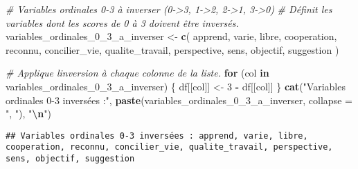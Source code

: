 \documentclass[
]{article}
\newenvironment{Shaded}{\begin{snugshade}}{\end{snugshade}}
\newcommand{\AttributeTok}[1]{\textcolor[rgb]{0.13,0.29,0.53}{#1}}
\newcommand{\CommentTok}[1]{\textcolor[rgb]{0.56,0.35,0.01}{\textit{#1}}}
\newcommand{\ControlFlowTok}[1]{\textcolor[rgb]{0.13,0.29,0.53}{\textbf{#1}}}
\newcommand{\DecValTok}[1]{\textcolor[rgb]{0.00,0.00,0.81}{#1}}
\newcommand{\FunctionTok}[1]{\textcolor[rgb]{0.13,0.29,0.53}{\textbf{#1}}}
\newcommand{\NormalTok}[1]{#1}
\newcommand{\OtherTok}[1]{\textcolor[rgb]{0.56,0.35,0.01}{#1}}
\newcommand{\SpecialCharTok}[1]{\textcolor[rgb]{0.81,0.36,0.00}{\textbf{#1}}}
\newcommand{\StringTok}[1]{\textcolor[rgb]{0.31,0.60,0.02}{#1}}
\begin{document}
\begin{Shaded}
\begin{Highlighting}[]
\CommentTok{\# Variables ordinales 0{-}3 à inverser (0{-}\textgreater{}3, 1{-}\textgreater{}2, 2{-}\textgreater{}1, 3{-}\textgreater{}0)}
\CommentTok{\# Définit les variables dont les scores de 0 à 3 doivent être inversés.}
\NormalTok{variables\_ordinales\_0\_3\_a\_inverser }\OtherTok{\textless{}{-}} \FunctionTok{c}\NormalTok{(}
    \StringTok{\textquotesingle{}apprend\textquotesingle{}}\NormalTok{, }\StringTok{\textquotesingle{}varie\textquotesingle{}}\NormalTok{, }\StringTok{\textquotesingle{}libre\textquotesingle{}}\NormalTok{, }\StringTok{\textquotesingle{}cooperation\textquotesingle{}}\NormalTok{, }\StringTok{\textquotesingle{}reconnu\textquotesingle{}}\NormalTok{,}
    \StringTok{\textquotesingle{}concilier\_vie\textquotesingle{}}\NormalTok{, }\StringTok{\textquotesingle{}qualite\_travail\textquotesingle{}}\NormalTok{, }\StringTok{\textquotesingle{}perspective\textquotesingle{}}\NormalTok{, }\StringTok{\textquotesingle{}sens\textquotesingle{}}\NormalTok{,}
    \StringTok{\textquotesingle{}objectif\textquotesingle{}}\NormalTok{, }\StringTok{\textquotesingle{}suggestion\textquotesingle{}}
\NormalTok{)}

\CommentTok{\# Applique l\textquotesingle{}inversion à chaque colonne de la liste.}
\ControlFlowTok{for}\NormalTok{ (col }\ControlFlowTok{in}\NormalTok{ variables\_ordinales\_0\_3\_a\_inverser) \{}
\NormalTok{  df[[col]] }\OtherTok{\textless{}{-}} \DecValTok{3} \SpecialCharTok{{-}}\NormalTok{ df[[col]]}
\NormalTok{\}}
\FunctionTok{cat}\NormalTok{(}\StringTok{"Variables ordinales 0{-}3 inversées :"}\NormalTok{, }\FunctionTok{paste}\NormalTok{(variables\_ordinales\_0\_3\_a\_inverser, }\AttributeTok{collapse =} \StringTok{", "}\NormalTok{), }\StringTok{"}\SpecialCharTok{\textbackslash{}n}\StringTok{"}\NormalTok{)}
\end{Highlighting}
\end{Shaded}

\begin{verbatim}
## Variables ordinales 0-3 inversées : apprend, varie, libre, cooperation, reconnu, concilier_vie, qualite_travail, perspective, sens, objectif, suggestion
\end{verbatim}
\end{document}
